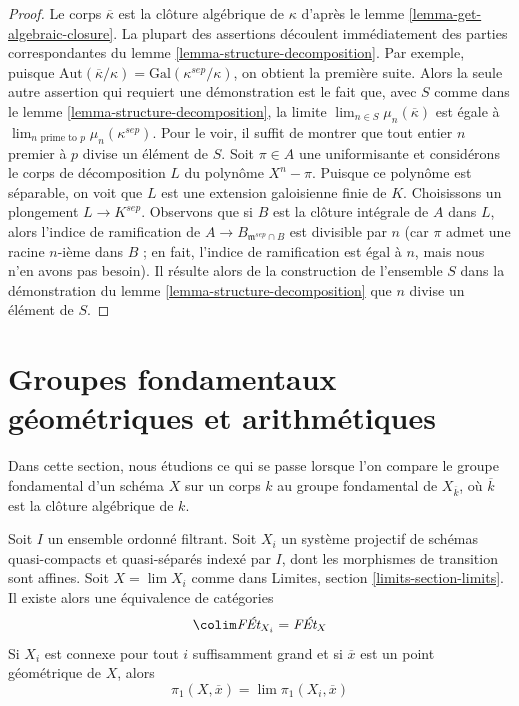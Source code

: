 \begin{proof}
Le corps $\overline{\kappa}$ est la clôture algébrique de $\kappa$ d'après le
lemme \ref{lemma-get-algebraic-closure}.
La plupart des assertions découlent immédiatement des parties correspondantes
du lemme \ref{lemma-structure-decomposition}. Par exemple, puisque
$\text{Aut}(\overline{\kappa}/\kappa) = \text{Gal}(\kappa^{sep}/\kappa)$,
on obtient la première suite.
Alors la seule autre assertion qui requiert une démonstration est le fait que,
avec $S$ comme dans le lemme \ref{lemma-structure-decomposition}, la
limite $\lim_{n \in S} \mu_n(\overline{\kappa})$ est égale à
$\lim_{n\text{ prime to }p} \mu_n(\kappa^{sep})$. Pour le voir,
il suffit de montrer que tout entier $n$ premier à $p$
divise un élément de $S$.
Soit $\pi \in A$ une uniformisante et considérons le corps de décomposition
$L$ du polynôme $X^n - \pi$. Puisque ce polynôme
est séparable, on voit que $L$ est une extension galoisienne finie de $K$.
Choisissons un plongement $L \to K^{sep}$.
Observons que si $B$ est la clôture intégrale de $A$ dans $L$,
alors l'indice de ramification de $A \to B_{\mathfrak m^{sep} \cap B}$
est divisible par $n$ (car $\pi$ admet une racine $n$-ième dans $B$ ; en fait,
l'indice de ramification est égal à $n$, mais nous n'en avons pas besoin).
Il résulte alors de la construction de l'ensemble $S$ dans la démonstration du
lemme \ref{lemma-structure-decomposition}
que $n$ divise un élément de $S$.
\end{proof}








\section{Groupes fondamentaux géométriques et arithmétiques}
\label{section-galois-action}

\noindent
Dans cette section, nous étudions ce qui se passe lorsque l'on compare le
groupe fondamental d'un schéma $X$ sur un corps $k$ au
groupe fondamental de $X_{\overline{k}}$, où $\overline{k}$
est la clôture algébrique de $k$.

\begin{lemma}
\label{lemma-limit}
Soit $I$ un ensemble ordonné filtrant. Soit $X_i$ un
système projectif de schémas quasi-compacts et quasi-séparés
indexé par $I$, dont les morphismes de transition sont affines.
Soit $X = \lim X_i$ comme dans Limites, section \ref{limits-section-limits}.
Il existe alors une équivalence de catégories
$$
\colim \textit{F\'Et}_{X_i} = \textit{F\'Et}_X
$$
Si $X_i$ est connexe pour tout $i$ suffisamment grand et si $\overline{x}$
est un point géométrique de $X$, alors
$$
\pi_1(X, \overline{x}) = \lim \pi_1(X_i, \overline{x})
$$
\end{lemma}


